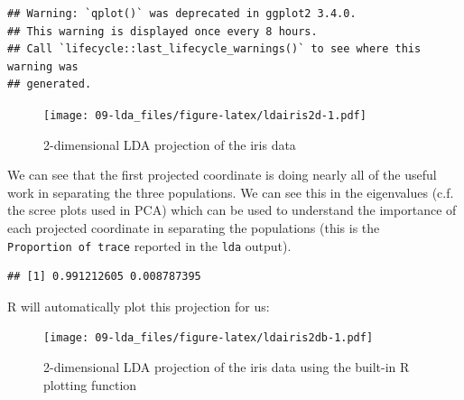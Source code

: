 \documentclass[
]{book}
\newenvironment{Shaded}{\begin{snugshade}}{\end{snugshade}}
\newcommand{\AttributeTok}[1]{\textcolor[rgb]{0.13,0.29,0.53}{#1}}
\newcommand{\DecValTok}[1]{\textcolor[rgb]{0.00,0.00,0.81}{#1}}
\newcommand{\FunctionTok}[1]{\textcolor[rgb]{0.13,0.29,0.53}{\textbf{#1}}}
\newcommand{\NormalTok}[1]{#1}
\newcommand{\OtherTok}[1]{\textcolor[rgb]{0.56,0.35,0.01}{#1}}
\newcommand{\SpecialCharTok}[1]{\textcolor[rgb]{0.81,0.36,0.00}{\textbf{#1}}}
\newcommand{\StringTok}[1]{\textcolor[rgb]{0.31,0.60,0.02}{#1}}
\theoremstyle{definition}
\theoremstyle{definition}
\theoremstyle{definition}
\theoremstyle{definition}
\theoremstyle{remark}
\begin{document}
\begin{verbatim}
## Warning: `qplot()` was deprecated in ggplot2 3.4.0.
## This warning is displayed once every 8 hours.
## Call `lifecycle::last_lifecycle_warnings()` to see where this warning was
## generated.
\end{verbatim}

\begin{figure}
\centering
\texttt{[image: 09-lda\_files/figure-latex/ldairis2d-1.pdf]}
\caption{\label{fig:ldairis2d}2-dimensional LDA projection of the iris data}
\end{figure}

We can see that the first projected coordinate is doing nearly all of the useful work in separating the three populations. We can see this in the eigenvalues (c.f. the scree plots used in PCA) which can be used to understand the importance of each projected coordinate in separating the populations (this is the \texttt{Proportion\ of\ trace} reported in the \texttt{lda} output).

\begin{Shaded}
\end{Shaded}

\begin{verbatim}
## [1] 0.991212605 0.008787395
\end{verbatim}

R will automatically plot this projection for us:

\begin{Shaded}
\end{Shaded}

\begin{figure}
\centering
\texttt{[image: 09-lda\_files/figure-latex/ldairis2db-1.pdf]}
\caption{\label{fig:ldairis2db}2-dimensional LDA projection of the iris data using the built-in R plotting function}
\end{figure}
\end{document}
